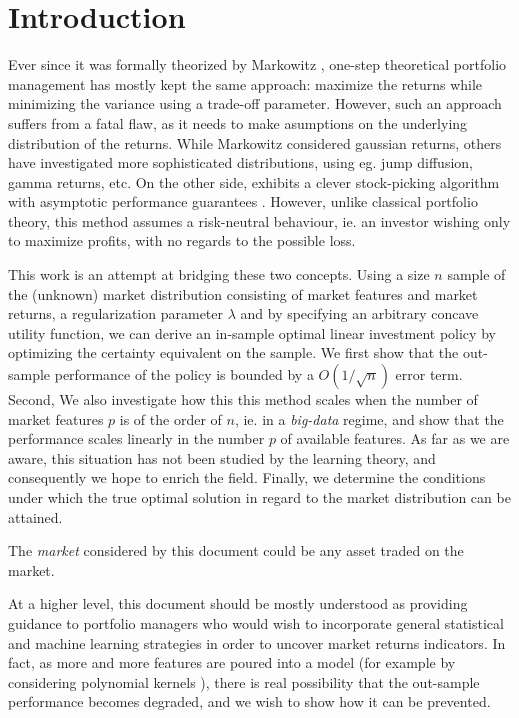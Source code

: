 \section{Introduction}
\label{sec:intro}

Ever since it was formally theorized by Markowitz \cite{markowitz1952portfolio}, one-step
theoretical portfolio management has mostly kept the same approach: maximize the returns
while minimizing the variance using a trade-off parameter. However, such an approach
suffers from a fatal flaw, as it needs to make asumptions on the underlying distribution
of the returns. While Markowitz considered gaussian returns, others have investigated more
sophisticated distributions, using eg. jump diffusion, gamma returns,
etc.   On the other side, \cite{cover1991universal} exhibits a
clever stock-picking algorithm with asymptotic performance guarantees
. However, unlike classical portfolio theory, this
method assumes a risk-neutral behaviour, ie. an investor wishing only to maximize profits,
with no regards to the possible loss. 

This work is an attempt at bridging these two concepts. Using a size $n$ sample of the
(unknown) market distribution consisting of market features and market returns, a
regularization parameter $\lambda$ and by specifying an arbitrary concave utility
function, we can derive an in-sample optimal linear investment policy by optimizing the
certainty equivalent on the sample. We first show that the out-sample performance of the
policy is bounded by a $O(1/\sqrt{n})$ error term. Second, We also investigate how this
this method scales when the number of market features $p$ is of the order of $n$, ie. in a
\textit{big-data} regime, and show that the performance scales linearly in the number $p$
of available features. As far as we are aware, this situation has not been studied by the
learning theory, and consequently we hope to enrich the field. 
Finally, we determine the conditions under which the true optimal solution in regard to
the market distribution can be attained. 

The \textit{market} considered by this document could  be any  asset
traded on the market.

At a higher level, this document should be mostly understood as providing guidance to
portfolio managers who would wish to incorporate general statistical and machine learning
strategies in order to uncover market returns indicators. In fact, as more and more
features are poured into a model (for example by considering polynomial kernels
), there is real possibility that the out-sample performance
becomes degraded, and we wish to show how it can be prevented. 



